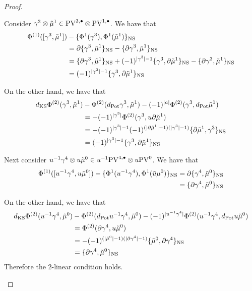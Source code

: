 \documentclass[11pt]{amsart}
\def\PV{{\rm PV}}
\def\del{\partial}
\begin{document}
\begin{proof}
\begin{itemize}
      Consider $\gamma^{3}\otimes \tilde \mu^{1}\in \PV^{3,\bu}\otimes \PV^{1,\bu}$. We have that
      \begin{align*}
        \Phi^{(1)}([\gamma^{3},\tilde \mu^{1}]) &-\{\Phi^{1}(\gamma^{3}),\Phi^{1}(\tilde \mu^{1})\}_{\rm NS} \\
        &= \partial\{\gamma^{3}, \tilde \mu^{1}\}_{\rm NS}-\{\partial \gamma^{3}, \tilde \mu^{1}\}_{\rm NS} \\
        &= \{\partial \gamma^{3}, \tilde \mu^{1}\}_{\rm NS}+(-1)^{|\gamma^{3}|-1}\{\gamma^{3}, \partial \tilde \mu^{1}\}_{\rm NS} - \{\partial\gamma^{3}, \tilde \mu^{1}\}_{\rm NS} \\
        &= (-1)^{|\gamma^{3}|-1}\{\gamma^{3}, \partial \tilde \mu^{1}\}_{\rm NS}
      \end{align*}

      On the other hand, we have that
      \begin{align*}
        d_{\rm KS}\Phi^{(2)}(\gamma^{3},\tilde\mu^{1}) & -\Phi^{(2)}(d_{\rm Pot}\gamma^{3}, \tilde \mu^{1})-(-1)^{|a|}\Phi^{(2)}(\gamma^{3},d_{\rm Pot}\tilde\mu^{1})\\
        &= -(-1)^{|\gamma^{3}|}\Phi^{(2)}(\gamma^{3}, u\partial \tilde \mu^{1}) \\
        &= -(-1)^{|\gamma^{3}|-1}(-1)^{(|\partial\tilde\mu^{1}|-1)(|\gamma^{3}|-1)}\{\partial \tilde\mu^{1},\gamma^{3}\}_{\rm NS}\\
        &= (-1)^{|\gamma^{3}|-1}\{\gamma^{3},\partial\tilde\mu^{1}\}_{\rm NS}
      \end{align*}

      Next consider $u^{-1}\gamma^{4}\otimes u \tilde\mu^{0}\in u^{-1}\PV^{4,\bu}\otimes u\PV^{0}$. We have that
       \begin{align*}
         \Phi^{(1)}([u^{-1}\gamma^{4},u\tilde \mu^{0}])-\{\Phi^{1}(u^{-1}\gamma^{4}),\Phi^{1}(\tilde u\mu^{0})\}_{\rm NS} &= \partial\{\gamma^{4}, \tilde \mu^{0}\}_{\rm NS} \\
         &= \{\partial \gamma^{4}, \tilde\mu^{0}\}_{\rm NS}
      \end{align*}

      On the other hand, we have that
      \begin{align*}
        d_{\rm KS}\Phi^{(2)}(u^{-1}\gamma^{4},\tilde\mu^{0}) & -\Phi^{(2)}(d_{\rm Pot}u^{-1}\gamma^{4}, \tilde \mu^{0})-(-1)^{|u^{-1}\gamma^{4}|}\Phi^{(2)}(u^{-1}\gamma^{4},d_{\rm Pot}u\tilde\mu^{0}) \\
        &=\Phi^{(2)}(\partial\gamma^{4},u\tilde\mu^{0})\\
        &= -(-1)^{(|\tilde \mu^{0}|-1)(|\del\gamma^{4}|-1)}\{\tilde\mu^{0}, \partial\gamma^{4}\}_{\rm NS} \\
        &= \{\partial \gamma^{4}, \tilde\mu^{0}\}_{\rm NS}
      \end{align*}
      Therefore the 2-linear condition holds.


\end{itemize}
\end{proof}
\end{document}
